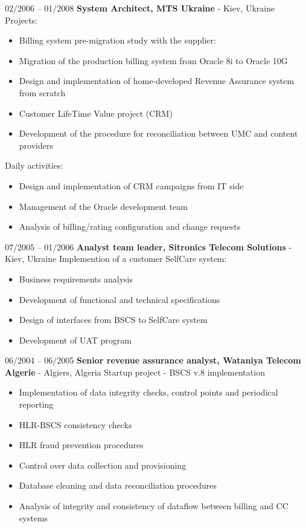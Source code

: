 \documentclass[10pt,a4paper]{extbook}
\begin{document}
02/2006 – 01/2008 \hspace{10mm} \textbf{System Architect, MTS Ukraine} \hspace{10mm} - Kiev, Ukraine
Projects: 
\begin{itemize}
	\item Billing system pre-migration study with the supplier:
	\item Migration of the production billing system from Oracle 8i to Oracle 10G
	\item Design and implementation of home-developed Revenue Assurance system from scratch
	\item Customer LifeTime Value project (CRM)
	\item Development of the procedure for reconciliation between UMC and content providers
\end{itemize}
Daily activities:
\begin{itemize}
	\item Design and implementation of CRM campaigns from IT side
	\item Management of the Oracle development team
	\item Analysis of billing/rating configuration and change requests
\end{itemize}
	
07/2005 – 01/2006 \hspace{10mm} \textbf{Analyst team leader, Sitronics Telecom Solutions} \hspace{10mm} - Kiev, Ukraine
Implemention of a customer SelfCare system:
\begin{itemize}
	\item Business requirements analysis
	\item Development of functional and technical specifications
	\item Design of interfaces from BSCS to SelfCare system
	\item Development of UAT program
\end{itemize}
	
06/2004 – 06/2005 \hspace{10mm} \textbf{Senior revenue assurance analyst, Wataniya Telecom Algerie} \hspace{10mm} - Algiers, Algeria
Startup project - BSCS v.8 implementation
\begin{itemize}
	\item Implementation of data integrity checks, control points and periodical reporting
	\item HLR-BSCS consistency checks
	\item HLR fraud prevention procedures
	\item Control over data collection and provisioning
	\item Database cleaning and data reconciliation procedures
	\item Analysis of integrity and consistency of dataflow between billing and CC systems
\end{itemize}
	
\end{document}

